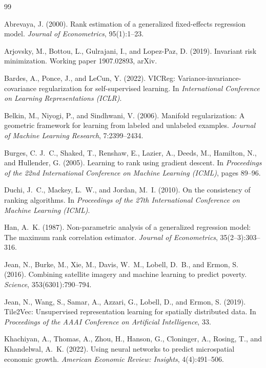 \documentclass[11pt]{article}
\theoremstyle{tight}
\begin{document}
\begin{thebibliography}{99}\small

Abrevaya, J. (2000). Rank estimation of a generalized fixed-effects regression model.
\emph{Journal of Econometrics}, 95(1):1--23.

Arjovsky, M., Bottou, L., Gulrajani, I., and Lopez-Paz, D. (2019). Invariant risk minimization.
Working paper 1907.02893, arXiv.

Bardes, A., Ponce, J., and LeCun, Y. (2022). VICReg: Variance-invariance-covariance
regularization for self-supervised learning. In \emph{International Conference on Learning
Representations (ICLR)}.

Belkin, M., Niyogi, P., and Sindhwani, V. (2006). Manifold regularization: A geometric framework
for learning from labeled and unlabeled examples. \emph{Journal of Machine Learning Research},
7:2399--2434.

Burges, C. J.~C., Shaked, T., Renshaw, E., Lazier, A., Deeds, M., Hamilton, N., and Hullender, G.
(2005). Learning to rank using gradient descent. In \emph{Proceedings of the 22nd International
Conference on Machine Learning (ICML)}, pages 89--96.

Duchi, J.~C., Mackey, L.~W., and Jordan, M.~I. (2010). On the consistency of ranking algorithms.
In \emph{Proceedings of the 27th International Conference on Machine Learning (ICML)}.

Han, A.~K. (1987). Non-parametric analysis of a generalized regression model: The maximum rank
correlation estimator. \emph{Journal of Econometrics}, 35(2--3):303--316.

Jean, N., Burke, M., Xie, M., Davis, W.~M., Lobell, D.~B., and Ermon, S. (2016). Combining
satellite imagery and machine learning to predict poverty. \emph{Science}, 353(6301):790--794.

Jean, N., Wang, S., Samar, A., Azzari, G., Lobell, D., and Ermon, S. (2019). Tile2Vec:
Unsupervised representation learning for spatially distributed data. In \emph{Proceedings of the
AAAI Conference on Artificial Intelligence}, 33.

Khachiyan, A., Thomas, A., Zhou, H., Hanson, G., Cloninger, A., Rosing, T., and Khandelwal,
A.~K. (2022). Using neural networks to predict microspatial economic growth. \emph{American
Economic Review: Insights}, 4(4):491--506.


\end{thebibliography}
\end{document}
